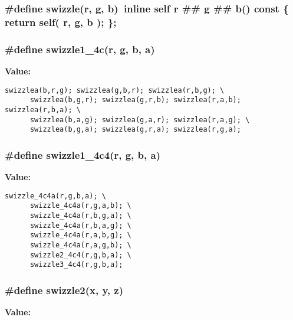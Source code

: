 \subsubsection{\setlength{\rightskip}{0pt plus 5cm}\#define swizzle(r, g, b)\ inline self  r \#\# g \#\# b()  const \{ return self( r, g, b ); \};}\label{mrSwizzle_8h_a0}


\subsubsection{\setlength{\rightskip}{0pt plus 5cm}\#define swizzle1\_\-4c(r, g, b, a)}\label{mrSwizzle_8h_a3}


{\bf Value:}

\footnotesize\begin{verbatim}swizzlea(b,r,g); swizzlea(g,b,r); swizzlea(r,b,g); \
      swizzlea(b,g,r); swizzlea(g,r,b); swizzlea(r,a,b); swizzlea(r,b,a); \
      swizzlea(b,a,g); swizzlea(g,a,r); swizzlea(r,a,g); \
      swizzlea(b,g,a); swizzlea(g,r,a); swizzlea(r,g,a);
\end{verbatim}\normalsize 
{}
\subsubsection{\setlength{\rightskip}{0pt plus 5cm}\#define swizzle1\_\-4c4(r, g, b, a)}\label{mrSwizzle_8h_a10}


{\bf Value:}

\footnotesize\begin{verbatim}swizzle_4c4a(r,g,b,a); \
      swizzle_4c4a(r,g,a,b); \
      swizzle_4c4a(r,b,g,a); \
      swizzle_4c4a(r,b,a,g); \
      swizzle_4c4a(r,a,b,g); \
      swizzle_4c4a(r,a,g,b); \
      swizzle2_4c4(r,g,b,a); \
      swizzle3_4c4(r,g,b,a);
\end{verbatim}\normalsize 
{}
\subsubsection{\setlength{\rightskip}{0pt plus 5cm}\#define swizzle2(x, y, z)}\label{mrSwizzle_8h_a2}


{\bf Value:}


